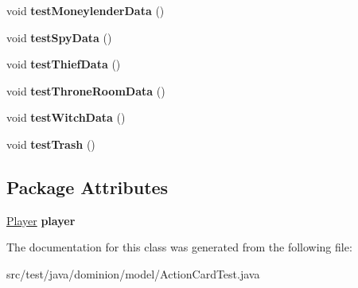 \begin{DoxyCompactItemize}
\item 
\hypertarget{classdominion_1_1model_1_1ActionCardTest_a1f92515e81fa250f8774ccd23ae19287}{void {\bfseries test\-Moneylender\-Data} ()}\label{classdominion_1_1model_1_1ActionCardTest_a1f92515e81fa250f8774ccd23ae19287}

\item 
\hypertarget{classdominion_1_1model_1_1ActionCardTest_a233830fc662c4192025a374bca8dce95}{void {\bfseries test\-Spy\-Data} ()}\label{classdominion_1_1model_1_1ActionCardTest_a233830fc662c4192025a374bca8dce95}

\item 
\hypertarget{classdominion_1_1model_1_1ActionCardTest_a2cddadb4399eec5d339a8705093b6b24}{void {\bfseries test\-Thief\-Data} ()}\label{classdominion_1_1model_1_1ActionCardTest_a2cddadb4399eec5d339a8705093b6b24}

\item 
\hypertarget{classdominion_1_1model_1_1ActionCardTest_a8ec0f25da176e9376b1674961b38ff13}{void {\bfseries test\-Throne\-Room\-Data} ()}\label{classdominion_1_1model_1_1ActionCardTest_a8ec0f25da176e9376b1674961b38ff13}

\item 
\hypertarget{classdominion_1_1model_1_1ActionCardTest_afbb00c4c1d2a8566ca5dd3202522c66f}{void {\bfseries test\-Witch\-Data} ()}\label{classdominion_1_1model_1_1ActionCardTest_afbb00c4c1d2a8566ca5dd3202522c66f}

\item 
\hypertarget{classdominion_1_1model_1_1ActionCardTest_aadb93d9c97d5c70f1cf3ab52bf2d246b}{void {\bfseries test\-Trash} ()}\label{classdominion_1_1model_1_1ActionCardTest_aadb93d9c97d5c70f1cf3ab52bf2d246b}

\end{DoxyCompactItemize}
\subsection*{\-Package \-Attributes}
\begin{DoxyCompactItemize}
\item 
\hypertarget{classdominion_1_1model_1_1ActionCardTest_a8ef17b177e2f9edc5f71c0c07b823c35}{\hyperlink{interfacedominion_1_1model_1_1Player}{\-Player} {\bfseries player}}\label{classdominion_1_1model_1_1ActionCardTest_a8ef17b177e2f9edc5f71c0c07b823c35}

\end{DoxyCompactItemize}


\-The documentation for this class was generated from the following file\-:\begin{DoxyCompactItemize}
\item 
src/test/java/dominion/model/\-Action\-Card\-Test.\-java\end{DoxyCompactItemize}
